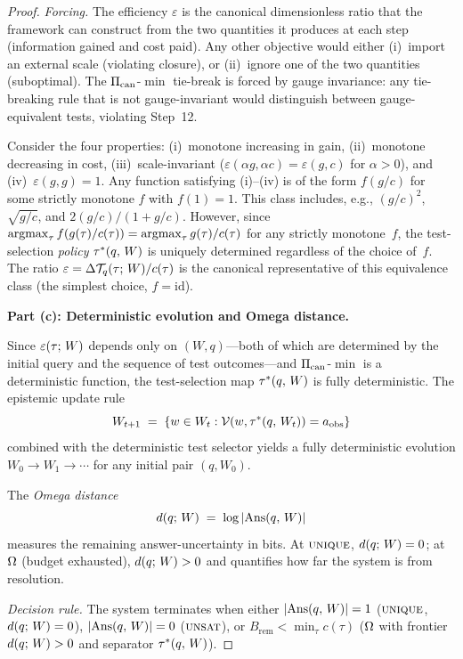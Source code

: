 \begin{proof}
\emph{Forcing.}  The efficiency $\varepsilon$ is the canonical dimensionless
ratio that the framework can construct from the two quantities it
produces at each step (information gained and cost paid).  Any other
objective would either (i)~import an external scale (violating closure),
or (ii)~ignore one of the two quantities (suboptimal).  The
$\Pi_{\mathrm{can}}$-$\min$ tie-break is forced by gauge invariance: any
tie-breaking rule that is not gauge-invariant would distinguish between
gauge-equivalent tests, violating Step~12.

\begin{remark}
\label{rem:efficiency-uniqueness}
Consider the four properties: (i)~monotone increasing in gain,
(ii)~monotone decreasing in cost, (iii)~scale-invariant
($\varepsilon(\alpha g, \alpha c) = \varepsilon(g,c)$ for $\alpha > 0$),
and (iv)~$\varepsilon(g,g) = 1$.  Any function satisfying (i)--(iv) is
of the form $f(g/c)$ for some strictly monotone $f$ with $f(1) = 1$.
This class includes, e.g., $(g/c)^2$, $\sqrt{g/c}$, and
$2(g/c)/(1 + g/c)$.  However, since $\argmax_\tau f(g(\tau)/c(\tau))
= \argmax_\tau g(\tau)/c(\tau)$ for any strictly monotone~$f$, the
test-selection \emph{policy} $\tau^*(q,\, W)$ is uniquely determined
regardless of the choice of~$f$.  The ratio
$\varepsilon = \Delta\mathcal{T}_{q}(\tau;\,W) / c(\tau)$ is the canonical
representative of this equivalence class (the simplest choice,
$f = \mathrm{id}$).
\end{remark}

\bigskip\noindent
\textbf{Part (c): Deterministic evolution and Omega distance.}

Since $\varepsilon(\tau;\, W)$ depends only on $(W, q)$---both of which are
determined by the initial query and the sequence of test outcomes---and
$\Pi_{\mathrm{can}}$-$\min$ is a deterministic function, the test-selection
map $\tau^*(q,\, W)$ is fully deterministic.  The epistemic
update rule
\[
  W_{t+1} \;=\; \{w \in W_t : \mathcal{V}(w, \tau^*(q,\, W_t)) = a_{\mathrm{obs}}\}
\]
combined with the deterministic test selector yields a fully
deterministic evolution $W_0 \to W_1 \to \cdots$ for any initial
pair $(q, W_0)$.

The \emph{Omega distance}
\[
  d(q;\, W) \;=\; \log|\mathrm{Ans}(q,\, W)|
\]
measures the remaining answer-uncertainty in bits.  At $\textsc{unique}$,
$d(q;\, W) = 0$; at $\Omega$ (budget exhausted),
$d(q;\, W) > 0$ and quantifies how far the system is from
resolution.

\emph{Decision rule.}  The system terminates when either
$|\mathrm{Ans}(q,\, W)| = 1$ ($\textsc{unique}$, $d(q;\, W) = 0$),
$|\mathrm{Ans}(q,\, W)| = 0$ ($\textsc{unsat}$), or
$B_{\mathrm{rem}} < \min_\tau c(\tau)$ ($\Omega$ with frontier
$d(q;\, W) > 0$ and separator $\tau^*(q,\, W)$).
\end{proof}

